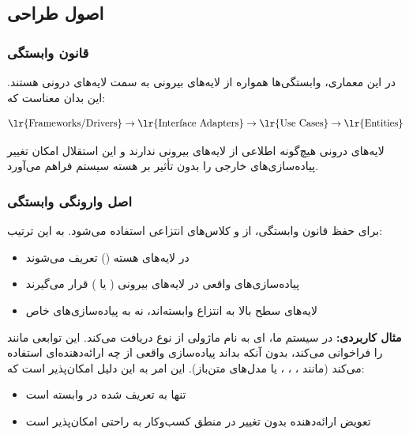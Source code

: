 \subsection{اصول طراحی}

\subsubsection{قانون وابستگی }

در این معماری، وابستگی‌ها همواره از لایه‌های بیرونی به سمت لایه‌های درونی هستند. این بدان معناست که:

\begin{equation}
\text{\lr{Frameworks/Drivers}} \rightarrow \text{\lr{Interface Adapters}} \rightarrow \text{\lr{Use Cases}} \rightarrow \text{\lr{Entities}}
\end{equation}

\noindent
لایه‌های درونی هیچ‌گونه اطلاعی از لایه‌های بیرونی ندارند و این استقلال امکان تغییر پیاده‌سازی‌های خارجی را بدون تأثیر بر هسته سیستم فراهم می‌آورد.

\subsubsection{اصل وارونگی وابستگی }

برای حفظ قانون وابستگی، از  و کلاس‌های انتزاعی استفاده می‌شود. به این ترتیب:

\begin{itemize}
    \item {} در لایه‌های هسته () تعریف می‌شوند
    \item پیاده‌سازی‌های واقعی در لایه‌های بیرونی ( یا ) قرار می‌گیرند
    \item لایه‌های سطح بالا به انتزاع وابسته‌اند، نه به پیاده‌سازی‌های خاص
\end{itemize}


\noindent

\textbf{مثال کاربردی:} در سیستم ما، ای به نام  ماژولی از نوع  دریافت می‌کند. این  توابعی مانند  را فراخوانی می‌کند، بدون آنکه بداند پیاده‌سازی واقعی از چه ارائه‌دهنده‌ای استفاده می‌کند (مانند ، ، ، یا مدل‌های متن‌باز). این امر به این دلیل امکان‌پذیر است که:

\begin{itemize}
    \item {} تنها به  تعریف شده در  وابسته است
    \item تعویض ارائه‌دهنده  بدون تغییر در منطق کسب‌وکار به راحتی امکان‌پذیر است
\end{itemize}

